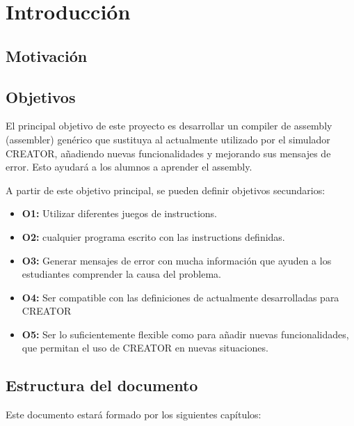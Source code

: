\chapter{Introducción}\label{chap:introduction}
\section{Motivación}\label{sec:motivation}



\section{Objetivos}\label{sec:objectives}

El principal objetivo de este proyecto es desarrollar un \gls{compiler} de
\gls{assembly} (\gls{assembler}) genérico que sustituya al actualmente utilizado
por el simulador CREATOR, añadiendo nuevas funcionalidades y mejorando sus
mensajes de error. Esto ayudará a los alumnos a aprender el \gls{assembly}.

\noindent
A partir de este objetivo principal, se pueden definir objetivos secundarios:

\begin{itemize}
    \item \textbf{O1:} Utilizar diferentes juegos de \glspl{instruction}.
    \item \textbf{O2:}  cualquier programa
     escrito con las \glspl{instruction}
    definidas.
    \item \textbf{O3:} Generar mensajes de error con mucha información que
    ayuden a los estudiantes comprender la causa del problema.
    \item \textbf{O4:} Ser compatible con las definiciones de
     actualmente desarrolladas para CREATOR
    \item \textbf{O5:} Ser lo suficientemente flexible como para añadir nuevas
    funcionalidades, que permitan el uso de CREATOR en nuevas situaciones.
\end{itemize}

\section{Estructura del documento}\label{sec:structure}

Este documento estará formado por los siguientes capítulos:

